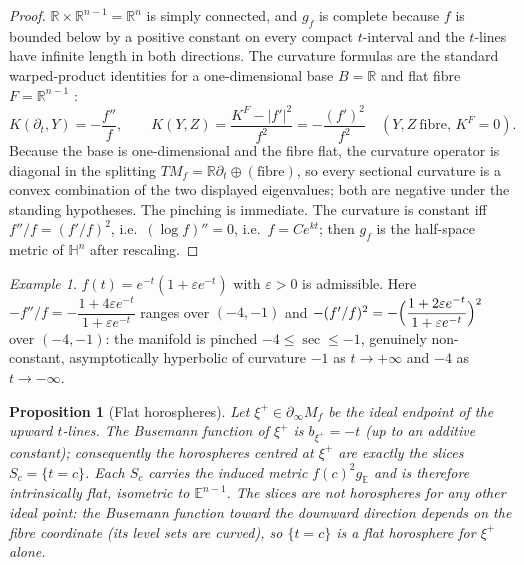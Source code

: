 \documentclass[11pt]{article}
\newtheorem{proposition}[theorem]{Proposition}
\theoremstyle{remark}
\newtheorem{example}[theorem]{Example}
\newcommand{\R}{\mathbb{R}}
\newcommand{\Sb}[1]{S_{#1}}
\newcommand{\Mf}{M_{f}}
\newcommand{\bdry}{\partial_{\infty}}
\newcommand{\E}{\mathbb{E}}
\newcommand{\HH}{\mathbb{H}}
\begin{document}
\begin{proof}
$\R\times\R^{n-1}=\R^{n}$ is simply connected, and $g_{f}$ is complete
because $f$ is bounded below by a positive constant on every compact
$t$-interval and the $t$-lines have infinite length in both
directions. The curvature formulas are the standard warped-product
identities for a one-dimensional base $B=\R$ and flat fibre
$F=\R^{n-1}$ \cite[Prop.~7.42]{One}:
\[
  K(\partial_{t},Y)=-\frac{f''}{f},\qquad
  K(Y,Z)=\frac{K^{F}-|f'|^{2}}{f^{2}}=-\frac{(f')^{2}}{f^{2}}
  \quad(Y,Z\ \text{fibre, }K^{F}=0).
\]
Because the base is one-dimensional and the fibre flat, the curvature
operator is diagonal in the splitting
$T\Mf=\R\partial_{t}\oplus(\text{fibre})$, so every sectional curvature
is a convex combination of the two displayed eigenvalues; both are
negative under the standing hypotheses. The pinching is immediate. The
curvature is constant iff $f''/f=(f'/f)^{2}$, i.e.\ $(\log f)''=0$,
i.e.\ $f=Ce^{kt}$; then $g_{f}$ is the half-space metric of $\HH^{n}$
after rescaling.
\end{proof}

\begin{example}\label{ex:warp}
$f(t)=e^{-t}(1+\varepsilon e^{-t})$ with $\varepsilon>0$ is admissible.
Here $-f''/f=-\dfrac{1+4\varepsilon e^{-t}}{1+\varepsilon e^{-t}}$
ranges over $(-4,-1)$ and $-(f'/f)^{2}=-\Bigl(\dfrac{1+2\varepsilon
e^{-t}}{1+\varepsilon e^{-t}}\Bigr)^{2}$ over $(-4,-1)$: the manifold
is pinched $-4\le\sec\le-1$, genuinely non-constant, asymptotically
hyperbolic of curvature $-1$ as $t\to+\infty$ and $-4$ as
$t\to-\infty$.
\end{example}

\begin{proposition}[Flat horospheres]\label{prop:mf-horo}
Let $\xi^{+}\in\bdry\Mf$ be the ideal endpoint of the upward
$t$-lines. The Busemann function of $\xi^{+}$ is $b_{\xi^{+}}=-t$ (up
to an additive constant); consequently the horospheres centred at
$\xi^{+}$ are exactly the slices $\Sb{c}=\{t=c\}$. Each $\Sb{c}$
carries the induced metric $f(c)^{2}g_{\E}$ and is therefore
intrinsically flat, isometric to $\E^{n-1}$. The slices are \emph{not}
horospheres for any other ideal point: the Busemann function toward the
downward direction depends on the fibre coordinate (its level sets are
curved), so $\{t=c\}$ is a flat horosphere for $\xi^{+}$ alone.
\end{proposition}
\end{document}
